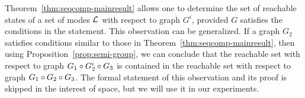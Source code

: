 Theorem~\ref{thm:seqcomp-mainresult} allows one to determine the set
of reachable states of a set of modes ${\mathcal L}$ with respect to graph
$G^i$, provided $G$ satisfies the conditions in the statement. This
observation can be generalized. If a graph $G_2$ satisfies conditions
similar to those in Theorem~\ref{thm:seqcomp-mainresult}, then using
Proposition~\ref{prop:semi-group}, we can conclude that the reachable
set with respect to graph $G_1\circ G_2^i\circ G_3$ is contained
in the reachable set with respect to graph $G_1\circ G_2\circ
G_3$. The formal statement of this observation and its proof is
skipped in the interest of space, but we will use it in our
experiments.


